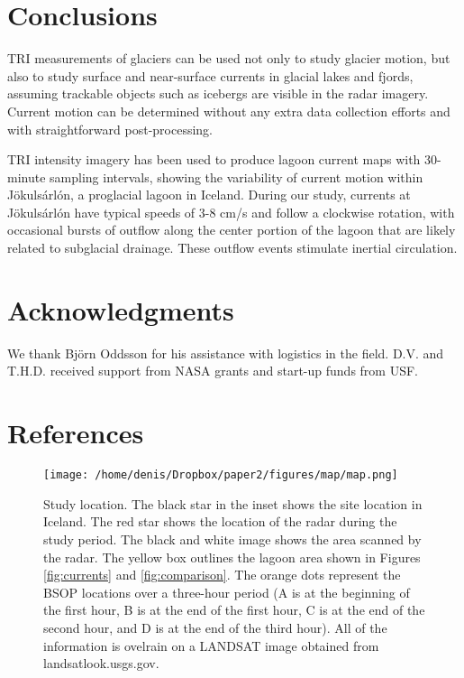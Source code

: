 \section{Conclusions}
TRI measurements of glaciers can be used not only to study glacier motion, but also to study surface and near-surface currents in glacial lakes and fjords, assuming  trackable objects such as icebergs are visible in the radar imagery. Current motion can be determined without any extra data collection efforts and with straightforward post-processing. 

TRI intensity imagery has been used to produce lagoon current maps with 30-minute sampling intervals, showing the variability of current motion within Jökulsárlón, a proglacial lagoon in Iceland. During our study,  currents at Jökulsárlón have typical speeds of 3-8 cm/s and follow a clockwise rotation, with occasional bursts of outflow along the center portion of the lagoon that are likely related to subglacial drainage. These outflow events stimulate inertial circulation.


\section{Acknowledgments}
We thank Björn Oddsson for his assistance with logistics in the field. D.V. and T.H.D. received support from NASA grants and start-up funds from USF.

\section{References}


\newpage

\begin{figure}
\centering
\texttt{[image: /home/denis/Dropbox/paper2/figures/map/map.png]}
\caption[Study location.]{Study location. The black star in the inset shows the site location in Iceland. The red star shows the location of the radar during the study period. The black and white image shows the area scanned by the radar. The yellow box outlines the lagoon area shown in Figures \ref{fig:currents} and \ref{fig:comparison}. The orange dots represent the BSOP locations over a three-hour period (A is at the beginning of the first hour, B is at the end of the first hour, C is at the end of the second hour, and D is at the end of the third hour). All of the information is ovelrain  on a LANDSAT image obtained from landsatlook.usgs.gov.}
\label{fig:map}
\end{figure}

